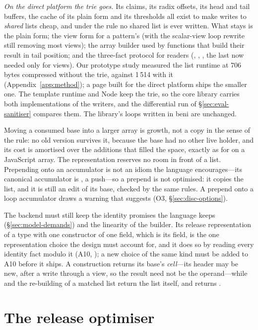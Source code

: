 \emph{On the direct platform the trie goes.} Its claims, its radix offsets, its head and tail buffers, the cache of its plain
form and its thresholds all exist to make writes to \emph{shared} lists cheap, and under the rule no
shared list is ever written. What stays is the plain form; the view form for a pattern's 
(with the scalar-view loop rewrite still removing most views); the array builder used by functions
that build their result in tail position; and the three-fact protocol for readers (,
, , the last now needed only for views). Our prototype study measured
the list runtime at 706 bytes compressed without the trie, against 1\,514 with it
(Appendix~\ref{app:method}); a page built for the direct platform ships the smaller one. The template
runtime and Node keep the trie, so the core library carries both implementations of the writers, and the
differential run of \S\ref{sec:eval-sanitiser} compares them. The library's loops written in beni are
unchanged.

Moving a consumed base into a larger array is growth, not a copy in the sense of the rule: no old
version survives it, because the base had no other live holder, and its cost is amortised over the
additions that filled the space, exactly as for  on a JavaScript array. The representation
reserves no room in front of a list. Prepending onto an accumulator is not an idiom the language
encourages---its canonical accumulator is \code{[ …acc, x ]}, a push---so a prepend is not optimised: it
copies the list, and it is still an edit of its base, checked by the same rules. A prepend onto a loop
accumulator draws a warning that suggests \code{[ …acc, x ]} (O3, \S\ref{sec:disc-options}).

The backend must still keep the identity promises the language keeps (\S\ref{sec:model-demands}) and the
linearity of the builder. Its release representation of a type with one constructor of one field, which
is its field, is the one representation choice the design must account for, and it does so by reading
every identity fact modulo it (A10, ); a new choice of the same kind must be added to A10 before it
ships. A construction returns its base's \emph{cell}---its header may be new, after a write
through a view, so the result need not be \code{===} the operand---while
\code{[ …xs ]} and the re-building of a matched list return the list itself, and  returns
.

\section{The release optimiser}
\label{sec:compiler-release}

